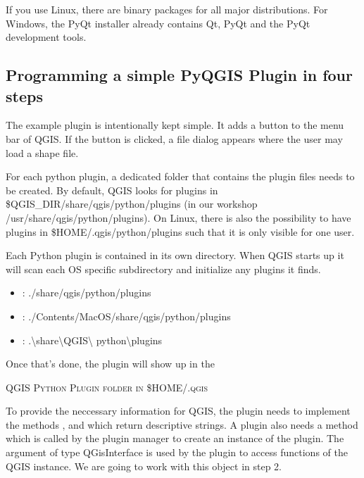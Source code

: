 If you use Linux, there are binary packages for all major distributions. For
Windows, the PyQt installer already contains Qt, PyQt and the PyQt
development tools.

\subsection{Programming a simple PyQGIS Plugin in four steps}

The example plugin is intentionally kept simple. It adds a button to the menu
bar of QGIS. If the button is clicked, a file dialog appears where the user
may load a shape file.

For each python plugin, a dedicated folder that contains the plugin files
needs to be created. By default, QGIS looks for plugins in
\$QGIS\_DIR/share/qgis/python/plugins (in our workshop
/usr/share/qgis/python/plugins). On Linux, there is also the possibility to
have plugins in \$HOME/.qgis/python/plugins such that it is only visible for
one user.


Each Python plugin is contained in its own directory. When QGIS starts up it
will scan each OS specific subdirectory and initialize any plugins it finds. 

\begin{itemize}
\item {}: ./share/qgis/python/plugins
\item {}: ./Contents/MacOS/share/qgis/python/plugins
\item {}: .\textbackslash share\textbackslash QGIS\textbackslash
python\textbackslash plugins
\end{itemize}

Once that's done, the plugin will show up in the

\begin{Tip}\caption{\textsc{QGIS Python Plugin folder in \$HOME/.qgis}}
\end{Tip}

To provide the neccessary information for QGIS, the plugin needs to implement
the methods ,  and 
which return descriptive strings. A plugin also needs a method
 which is called by the plugin manager to create
an instance of the plugin. The argument of type QGisInterface is used by the
plugin to access functions of the QGIS instance. We are going to work with
this object in step 2.  

